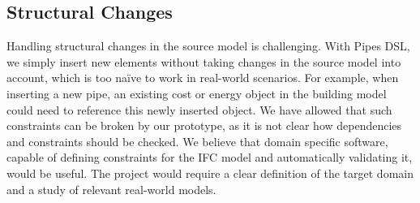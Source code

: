 \subsection{Structural Changes}
Handling structural changes in the source model is challenging. With Pipes DSL, we simply insert new elements without taking changes in the source model into account, which is too na\"{i}ve to work in real-world scenarios. For example, when inserting a new pipe, an existing cost or energy object in the building model could need to reference this newly inserted object. We have allowed that such constraints can be broken by our prototype, as it is not clear how dependencies and constraints should be checked. We believe that domain specific software, capable of defining constraints for the IFC model and automatically validating it, would be useful. The project would require a clear definition of the target domain and a study of relevant real-world models.





